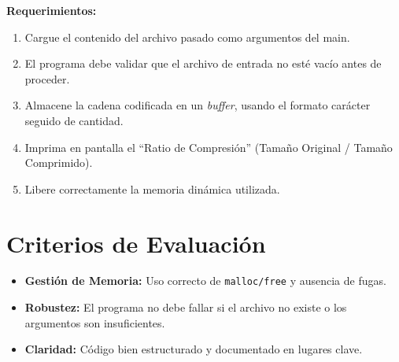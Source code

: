 \documentclass[12pt,a4paper]{article}
\begin{document}
\textbf{Requerimientos:}
\begin{enumerate}
    \item Cargue el contenido del archivo pasado como argumentos del main.
    \item El programa debe validar que el archivo de entrada no esté vacío antes de proceder.
    \item Almacene la cadena codificada en un \textit{buffer}, usando el formato carácter seguido de cantidad.
    \item Imprima en pantalla el ``Ratio de Compresión'' (Tamaño Original / Tamaño Comprimido).
    \item Libere correctamente la memoria dinámica utilizada.
\end{enumerate}

\section*{Criterios de Evaluación}
\begin{itemize}
    \item \textbf{Gestión de Memoria:} Uso correcto de \texttt{malloc/free} y ausencia de fugas.
    \item \textbf{Robustez:} El programa no debe fallar si el archivo no existe o los argumentos son insuficientes.
    \item \textbf{Claridad:} Código bien estructurado y documentado en lugares clave.
\end{itemize}
\end{document}

